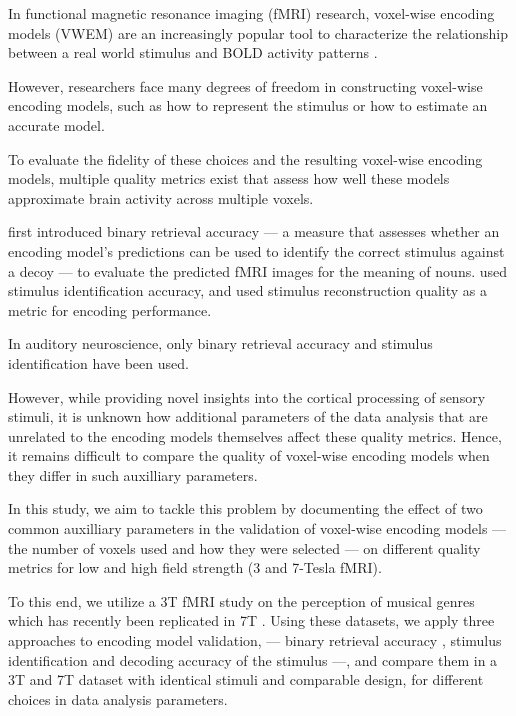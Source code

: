 In functional magnetic resonance imaging (f{MRI}) research, voxel-wise encoding
models (VWEM)  are an increasingly popular tool to characterize the relationship
between a real world stimulus and BOLD activity patterns
\citep{NG11,TD+06,KG+08,SZ09}.

However, researchers face many degrees of freedom in constructing voxel-wise encoding models, 
such as how to represent the stimulus or how to estimate an accurate model.

To evaluate the fidelity of these choices and the resulting voxel-wise encoding models,
multiple quality metrics exist that assess how well these models approximate brain activity across multiple voxels.

\citet{ML08} first introduced binary retrieval accuracy --- a measure that
assesses whether an encoding model's predictions can be used to identify the correct
stimulus against a decoy --- to evaluate the predicted f{MRI} images for the meaning
of nouns. \citet{KG+08} used stimulus identification accuracy, and \citet{NG09} used
stimulus reconstruction quality as a metric for encoding performance.

In auditory neuroscience, only binary retrieval accuracy \citep{CTK+2012,hoefle2018identifying}
and stimulus identification \citep{SF14,allen2018encoding} have been used. 

However, while providing novel insights into the cortical processing of sensory
stimuli, it is unknown how additional parameters of the data analysis that are unrelated to the encoding models themselves
affect these quality metrics.
Hence, it remains difficult to compare the quality of voxel-wise encoding models when they differ in such auxilliary parameters.

In this study, we aim to tackle this problem by documenting the effect of two common auxilliary parameters in the
validation of voxel-wise encoding models --- the number of voxels used and how they were selected --- on different
quality metrics for low and high field strength (3 and 7-Tesla f{MRI}).

To this end, we utilize a 3T f{MRI} study on the perception of musical genres
\citep{CTK+2012} which has recently been replicated in 7T \citep{HDH+2015}.
Using these datasets, we apply three approaches to encoding model
validation, --- binary retrieval accuracy \citep{ML08}, stimulus identification \citep{KG+08,SF14} and
decoding accuracy of the stimulus \citep{NG09} ---, and compare them in a 3T and 7T dataset with identical stimuli
and comparable design, for different choices in data analysis parameters.

